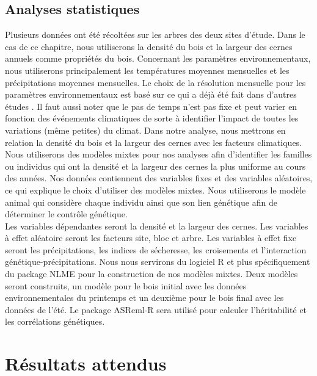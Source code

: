 \documentclass[a4paper,12pt]{report}
\begin{document}
\subsection*{Analyses statistiques}
Plusieurs données ont été récoltées sur les arbres des deux sites d'étude. Dans le cas de ce chapitre, nous utiliserons la densité du bois et la largeur des cernes annuels comme propriétés du bois. Concernant les paramètres environnementaux, nous utiliserons principalement les températures moyennes mensuelles et les précipitations moyennes mensuelles. Le choix de la résolution mensuelle pour les paramètres environnementaux est basé sur ce qui a déjà été fait dans d'autres études \citep{Franceschini2017}. Il faut aussi noter que le pas de temps n'est pas fixe et peut varier en fonction des événements climatiques de sorte à identifier l'impact de toutes les variations (même petites) du climat. Dans notre analyse, nous mettrons en relation la densité du bois et la largeur des cernes avec les facteurs climatiques. \\

Nous utiliserons des modèles mixtes pour nos analyses afin d'identifier les familles ou individus qui ont la densité et la largeur des cernes la plus uniforme au cours des années. Nos données contiennent des variables fixes et des variables aléatoires, ce qui explique le choix d'utiliser des modèles mixtes. Nous utiliserons le modèle animal qui considère chaque individu ainsi que son lien génétique afin de déterminer le contrôle génétique. \\ 
Les variables dépendantes seront la densité et la largeur des cernes. Les variables à effet aléatoire seront les facteurs site, bloc et arbre. Les variables à effet fixe seront les précipitations, les indices de sécheresse, les croisements et l'interaction génétique-précipitations. Nous nous servirons du logiciel R \citep{R2018} et plus spécifiquement du package NLME \citep{NLME2018} pour la construction de nos modèles mixtes. Deux modèles seront construits, un modèle pour le bois initial avec les données environnementales du printemps et un deuxième pour le bois final avec les données de l'été. Le package ASReml-R sera utilisé pour calculer l'héritabilité et les corrélations génétiques. 


\section{Résultats attendus}
\end{document}
